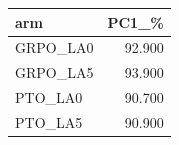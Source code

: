 \begin{tabular}{lr}
\toprule
arm & PC1\_\% \\
\midrule
GRPO\_LA0 & 92.900 \\
GRPO\_LA5 & 93.900 \\
PTO\_LA0 & 90.700 \\
PTO\_LA5 & 90.900 \\
\bottomrule
\end{tabular}

